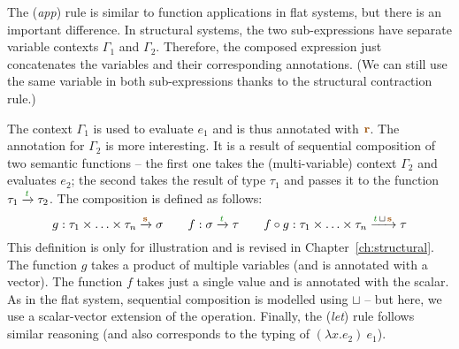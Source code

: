 The (\emph{app}) rule is similar to function applications in flat systems, but there is an important
difference. In structural systems, the two sub-expressions have separate variable contexts
$\Gamma_1$ and $\Gamma_2$. Therefore, the composed expression just concatenates the variables
and their corresponding annotations. (We can still use the same variable in both sub-expressions
thanks to the structural contraction rule.) 

The context $\Gamma_1$ is used to evaluate $e_1$ and is thus annotated with $\aclrd{\mathbf{r}}$. 
The annotation for $\Gamma_2$ is more interesting. It is a result of sequential composition of two
semantic functions -- the first one takes the (multi-variable) context $\Gamma_2$ and evaluates 
$e_2$; the second takes the result of type $\tau_1$ and passes it to the function $\tau_1 \xrightarrow{\cclrd{t}} \tau_2$.
The composition is defined as follows:
%
\begin{equation*}
g : \tau_1 \times \ldots \times \tau_n \xrightarrow{\aclrd{\mathbf{s}}} \sigma
\qquad
f : \sigma \xrightarrow{\cclrd{t}} \tau
\qquad
f \circ g : \tau_1 \times \ldots \times \tau_n \xrightarrow{\cclrd{t} \,\sqcup\, \aclrd{\mathbf{s}}} \tau
\end{equation*}
%
This definition is only for illustration and is revised in Chapter~\ref{ch:structural}. The function
$g$ takes a product of multiple variables (and is annotated with a vector). The function $f$ takes
just a single value and is annotated with the scalar. As in the flat system, sequential composition
is modelled using $\sqcup$ -- but here, we use a scalar-vector extension of the operation. Finally,
the (\emph{let}) rule follows similar reasoning (and also corresponds to the typing of $(\lambda x.e_2)~e_1$).



